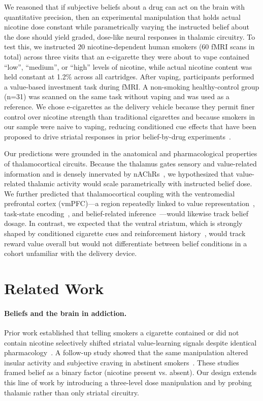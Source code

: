 We reasoned that if subjective beliefs about a drug can act on the brain with quantitative precision, then an experimental manipulation that holds actual nicotine dose constant while parametrically varying the instructed belief about the dose should yield graded, dose-like neural responses in thalamic circuitry. To test this, we instructed 20 nicotine-dependent human smokers (60 fMRI scans in total) across three visits that an e-cigarette they were about to vape contained ``low'', ``medium'', or ``high'' levels of nicotine, while actual nicotine content was held constant at 1.2\% across all cartridges. After vaping, participants performed a value-based investment task during fMRI. A non-smoking healthy-control group (n=31) was scanned on the same task without vaping and was used as a reference. We chose e-cigarettes as the delivery vehicle because they permit finer control over nicotine strength than traditional cigarettes and because smokers in our sample were naive to vaping, reducing conditioned cue effects that have been proposed to drive striatal responses in prior belief-by-drug experiments~\cite{gu2015belief}.

Our predictions were grounded in the anatomical and pharmacological properties of thalamocortical circuits. Because the thalamus gates sensory and value-related information and is densely innervated by nAChRs~\cite{sherman2016thalamus,halassa2017thalamic}, we hypothesized that value-related thalamic activity would scale parametrically with instructed belief dose. We further predicted that thalamocortical coupling with the ventromedial prefrontal cortex (vmPFC)---a region repeatedly linked to value representation~\cite{plassmann2007orbitofrontal,levy2012root}, task-state encoding~\cite{wilson2014orbitofrontal,schuck2016human}, and belief-related inference~\cite{rouault2018belief,rouault2022prefrontal}---would likewise track belief dosage. In contrast, we expected that the ventral striatum, which is strongly shaped by conditioned cigarette cues and reinforcement history~\cite{haber2010reward,schultz1997neural,kober2010brain}, would track reward value overall but would not differentiate between belief conditions in a cohort unfamiliar with the delivery device.

\section{Related Work}

\paragraph{Beliefs and the brain in addiction.} Prior work established that telling smokers a cigarette contained or did not contain nicotine selectively shifted striatal value-learning signals despite identical pharmacology~\cite{gu2015belief}. A follow-up study showed that the same manipulation altered insular activity and subjective craving in abstinent smokers~\cite{gu2016belief}. These studies framed belief as a binary factor (nicotine present vs. absent). Our design extends this line of work by introducing a three-level dose manipulation and by probing thalamic rather than only striatal circuitry.

